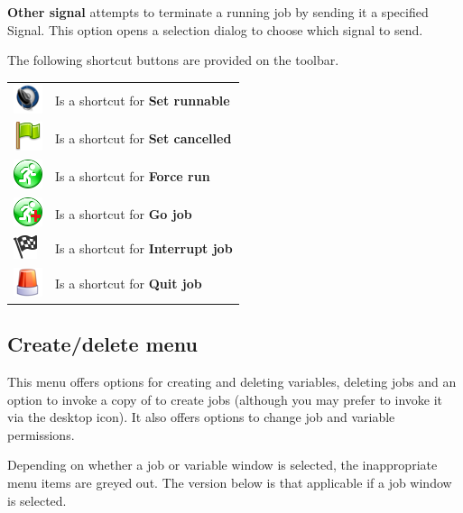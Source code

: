 \textbf{Other signal} attempts to terminate a running job by sending it
a specified Signal. This option opens a selection dialog to choose which signal to send.

The following shortcut buttons are provided on the toolbar.

\begin{tabular}{l p{12cm}}
\includegraphics{img/btqwsetrun.png} & Is a shortcut for \textbf{Set runnable}\\
\includegraphics{img/btqwsetcanc.png} & Is a shortcut for \textbf{Set cancelled}\\
\includegraphics{img/btqwforcerun.png} & Is a shortcut for \textbf{Force run}\\
\includegraphics{img/btqwgojob.png} & Is a shortcut for \textbf{Go job}\\
\includegraphics{img/btqwintjob.png} & Is a shortcut for \textbf{Interrupt job}\\
\includegraphics{img/btqwquitjob.png} & Is a shortcut for \textbf{Quit job}\\
\end{tabular}

\subsection{Create/delete menu}
This menu offers options for creating and deleting variables, deleting jobs and an option to invoke a copy of  to create
jobs (although you may prefer to invoke it via the desktop icon). It also offers options to change job and variable permissions.

Depending on whether a job or variable window is selected, the inappropriate menu items are greyed out. The version below is that
applicable if a job window is selected.

